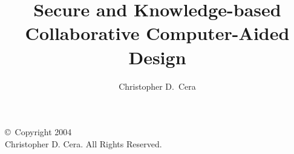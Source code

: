 \documentclass[12pt]{drexelthesis}
\title{Secure and Knowledge-based Collaborative Computer-Aided Design}
\author{Christopher D.~Cera}
\begin{document}
\maketitle

\begin{preliminary}

\thispagestyle{empty}
\vspace*{3.25in}
\begin{center}
\begin{spacing}{1}
\copyright ~Copyright 2004 \\
Christopher D.{} Cera.  All Rights Reserved.
\end{spacing}
\end{center}
\newpage

\setcounter{page}{2}

\date{} %

\begin{dedication}

\end{dedication}

\begin{acknowledgements}

\end{acknowledgements}


\renewcommand{\cfttoctitlefont}{\hfill\normalfont\bfseries}
\renewcommand{\cftaftertoctitle}{\hfill}
\renewcommand{\cftchapleader}{\cftsecleader}
\renewcommand{\cftchapfont}{\normalfont}
\setlength{\cftbeforechapskip}{\cftbeforesecskip}
\renewcommand{\cftchappagefont}{}
\mytableofcontents\newpage

\renewcommand{\cftlottitlefont}{\hfill\normalfont\bfseries}
\renewcommand{\cftafterlottitle}{\hfill}
\setlength{\baselineskip}{0.5\baselineskip}
\listoftables\newpage

\renewcommand{\cftloftitlefont}{\hfill\normalfont\bfseries}
\renewcommand{\cftafterloftitle}{\hfill}
\listoffigures\newpage
\setlength{\baselineskip}{2.0\baselineskip}

\begin{abstract}


\end{abstract}

\clearpage
\end{preliminary}
\end{document}
